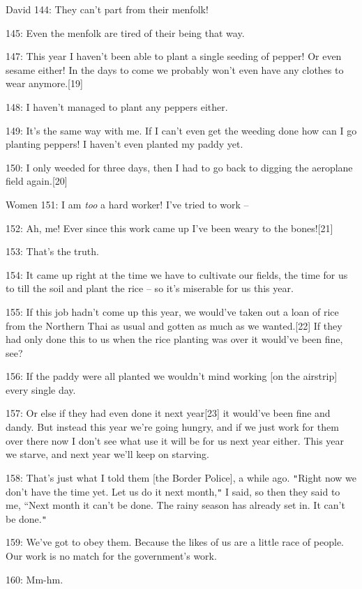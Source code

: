 {David 144: They can't part from their menfolk!}

{145: Even the menfolk are tired of their being that way. }

{147: This year I haven't been able to plant a single seeding of pepper!
Or even sesame either! In the days to come we probably won't even have any clothes
to wear anymore.[19]}

{148: I haven't managed to plant any peppers either.}

{149: It's the same way with me. If I can't even get the weeding done how
can I go planting peppers! I haven't even planted my paddy yet.}

{150: I only weeded for three days, then I had to go back to digging the
aeroplane field again.[20]}

{Women 151: I am }{\textit{too}}{ a hard worker! I've tried
to work --}

{152: Ah, me! Ever since this work came up I've been weary to the bones![21]}

{153: That's the truth.}

{154: It came up right at the time we have to cultivate our fields, the
time for us to till the soil and plant the rice -- so it's miserable for us this
year.}

{155: If this job hadn't come up this year, we would've taken out a loan
of rice from the Northern Thai as usual and gotten as much as we wanted.[22] If
they had only done this to us when the rice planting was over it would've been
fine, see?}

{156: If the paddy were all planted we wouldn't mind working [on the airstrip]
every single day.}

{157: Or else if they had even done it next year[23] it would've been fine
and dandy. But instead this year we're going hungry, and if we just work for them
over there now I don't see what use it will be for us next year either. This year
we starve, and next year we'll keep on starving. }

{158: That's just what I told them [the Border Police], a while ago. \texttt{"}Right
now we don't have the time yet. Let us do it next month,\texttt{"} I said, so then
they said to me, ``Next month it can't be done. The rainy season has already set
in. It can't be done.\texttt{"} }

{159: We've got to obey them. Because the likes of us are a little race
of people. Our work is no match for the government's work. }

{160: Mm-hm.}

